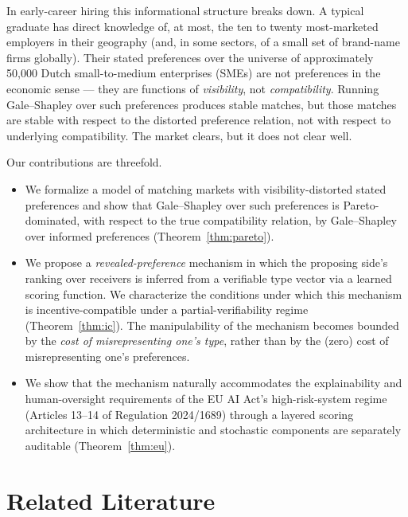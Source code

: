 \documentclass[11pt,a4paper]{article}
\begin{document}
In early-career hiring this informational structure breaks down. A typical graduate has direct knowledge of, at most, the ten to twenty most-marketed employers in their geography (and, in some sectors, of a small set of brand-name firms globally). Their stated preferences over the universe of approximately 50{,}000 Dutch small-to-medium enterprises (SMEs) are not preferences in the economic sense --- they are functions of \emph{visibility}, not \emph{compatibility}. Running Gale--Shapley over such preferences produces stable matches, but those matches are stable with respect to the distorted preference relation, not with respect to underlying compatibility. The market clears, but it does not clear well.

Our contributions are threefold.

\begin{itemize}[leftmargin=2em,itemsep=2pt,topsep=4pt]
    \item[\textbf{(C1)}] We formalize a model of matching markets with visibility-distorted stated preferences and show that Gale--Shapley over such preferences is Pareto-dominated, with respect to the true compatibility relation, by Gale--Shapley over informed preferences (Theorem~\ref{thm:pareto}).
    \item[\textbf{(C2)}] We propose a \emph{revealed-preference} mechanism in which the proposing side's ranking over receivers is inferred from a verifiable type vector via a learned scoring function. We characterize the conditions under which this mechanism is incentive-compatible under a partial-verifiability regime (Theorem~\ref{thm:ic}). The manipulability of the mechanism becomes bounded by the \emph{cost of misrepresenting one's type}, rather than by the (zero) cost of misrepresenting one's preferences.
    \item[\textbf{(C3)}] We show that the mechanism naturally accommodates the explainability and human-oversight requirements of the EU AI Act's high-risk-system regime (Articles 13--14 of Regulation 2024/1689) through a layered scoring architecture in which deterministic and stochastic components are separately auditable (Theorem~\ref{thm:eu}).
\end{itemize}

\section{Related Literature}
\label{sec:related}
\end{document}
